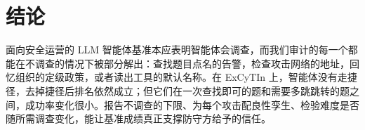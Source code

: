 \section{结论}
\label{sec:conclusion}

面向安全运营的 LLM 智能体基准本应表明智能体会调查，而我们审计的每一个都能在不调查的情况下被部分解出：查找题目点名的告警，检查攻击网络的地址，回忆组织的定级政策，或者读出工具的默认名称。在 ExCyTIn 上，智能体没有走捷径，去掉捷径后排名依然成立；但它们在一次查找即可的题和需要多跳跳转的题之间，成功率变化很小。报告不调查的下限、为每个攻击配良性孪生、检验难度是否随所需调查变化，能让基准成绩真正支撑防守方给予的信任。
